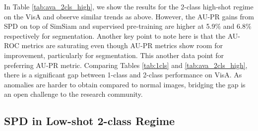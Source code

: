 \documentclass[runningheads]{llncs}
\begin{document}
In Table \ref{tab:ava_2cls_high}, we show the results for the 2-class high-shot regime on the VisA and observe similar trends as above. However, the AU-PR gains from SPD on top of SimSiam and supervised pre-training are higher at 5.9\% and 6.8\% respectively for segmentation. Another key point to note here is that the AU-ROC metrics are saturating even though AU-PR metrics show room for improvement, particularly for segmentation. This another data point for preferring AU-PR metric. 
Comparing Tables \ref{tab:1cls} and \ref{tab:ava_2cls_high}, there is a significant gap between 1-class and 2-class performance on VisA. As anomalies are harder to obtain compared to normal images, bridging the gap is an open challenge to the research community.

\subsection{SPD in Low-shot 2-class Regime}\label{sect:few-shot-results}
\end{document}
